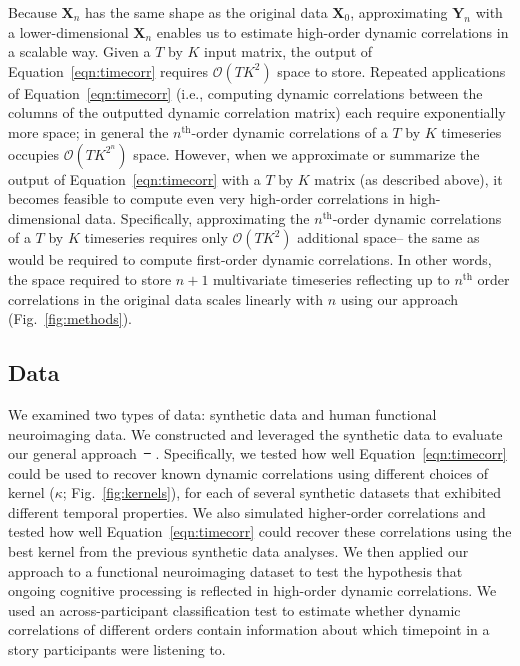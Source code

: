 \documentclass[english]{article}
\providecommand{\DIFaddtex}[1]{{\protect\color{blue}\uwave{#1}}} %
\providecommand{\DIFdeltex}[1]{{\protect\color{red}\sout{#1}}}                      %
\providecommand{\DIFaddbegin}{} %
\providecommand{\DIFaddend}{} %
\providecommand{\DIFdelbegin}{} %
\providecommand{\DIFdelend}{} %
\providecommand{\DIFadd}[1]{\texorpdfstring{\DIFaddtex{#1}}{#1}} %
\providecommand{\DIFdel}[1]{\texorpdfstring{\DIFdeltex{#1}}{}} %
\newcommand{\DIFscaledelfig}{0.5}
\newlength{\DIFdelgraphicswidth} %
\newlength{\DIFdelgraphicsheight} %
\newcommand{\DIFaddincludegraphics}[2][]{{\color{blue}\fbox{\DIFOincludegraphics[#1]{#2}}}} %
\newcommand{\DIFdelincludegraphics}[2][]{%
\sbox{\DIFdelgraphicsbox}{\DIFOincludegraphics[#1]{#2}}%
\settoboxwidth{\DIFdelgraphicswidth}{\DIFdelgraphicsbox} %
\settoboxtotalheight{\DIFdelgraphicsheight}{\DIFdelgraphicsbox} %
\scalebox{\DIFscaledelfig}{%
\parbox[b]{\DIFdelgraphicswidth}{\usebox{\DIFdelgraphicsbox}\\[-\baselineskip] \rule{\DIFdelgraphicswidth}{0em}}\llap{\resizebox{\DIFdelgraphicswidth}{\DIFdelgraphicsheight}{%
\setlength{\unitlength}{\DIFdelgraphicswidth}%
\begin{picture}(1,1)%
\thicklines\linethickness{2pt} %
{\color[rgb]{1,0,0}\put(0,0){\framebox(1,1){}}}%
{\color[rgb]{1,0,0}\put(0,0){\line( 1,1){1}}}%
{\color[rgb]{1,0,0}\put(0,1){\line(1,-1){1}}}%
\end{picture}%
}\hspace*{3pt}}} %
} %
\DeclareRobustCommand{\DIFaddbegin}{\DIFOaddbegin \let\includegraphics\DIFaddincludegraphics} %
\DeclareRobustCommand{\DIFaddend}{\DIFOaddend \let\includegraphics\DIFOincludegraphics} %
\DeclareRobustCommand{\DIFdelbegin}{\DIFOdelbegin \let\includegraphics\DIFdelincludegraphics} %
\DeclareRobustCommand{\DIFdelend}{\DIFOaddend \let\includegraphics\DIFOincludegraphics} %
\begin{document}
Because $\mathbf{X}_n$ has the same shape as the original data
$\mathbf{X}_0$, approximating $\mathbf{Y}_n$ with a lower-dimensional
$\mathbf{X}_n$ enables us to estimate high-order dynamic correlations
in a scalable way.  Given a $T$ by $K$ input matrix, the output of
Equation~\ref{eqn:timecorr} requires $\mathcal{O}(TK^2)$ space to
store.  Repeated applications of Equation~\ref{eqn:timecorr} (i.e.,
computing dynamic correlations between the columns of the outputted
dynamic correlation matrix) each require exponentially more space; in
general the $n^\mathrm{th}$-order dynamic correlations of a $T$ by $K$
timeseries occupies $\mathcal{O}(TK^{2^n})$ space.  However, when we
approximate or summarize the output of Equation~\ref{eqn:timecorr} with a $T$ by
$K$ matrix (as described above), it becomes feasible to compute even
very high-order correlations in high-dimensional data.  Specifically,
approximating the $n^\mathrm{th}$-order dynamic correlations of a $T$
by $K$ timeseries requires only $\mathcal{O}(TK^2)$ additional space--
the same as would be required to compute first-order dynamic
correlations. In other words, the space required to store $n+1$
multivariate timeseries reflecting up to $n^\mathrm{th}$ order
correlations in the original data scales linearly with $n$ using our
approach (Fig.~\ref{fig:methods}).

\subsection*{Data}
We examined two types of data: synthetic data and human functional
neuroimaging data.  We constructed and leveraged the synthetic data to
evaluate our general approach~\DIFdelbegin \DIFdel{\mbox{%
\citep[for a related validation approach
see][]{ThomEtal18}}\hspace{0pt}%
}\DIFdelend \DIFaddbegin \DIFadd{\mbox{%
\cite{ThomEtal18}}\hspace{0pt}%
}\DIFaddend .  Specifically, we tested how well
Equation~\ref{eqn:timecorr} could be used to recover known dynamic
correlations using different choices of kernel ($\kappa$;
Fig.~\ref{fig:kernels}), for each of several synthetic datasets that
exhibited different temporal properties. We also simulated
higher-order correlations and tested how well
Equation~\ref{eqn:timecorr} could recover these correlations using the
best kernel from the previous synthetic data analyses.  We then applied our
approach to a functional neuroimaging dataset to test the hypothesis
that ongoing cognitive processing is reflected in high-order dynamic
correlations.  We used an across-participant classification test to
estimate whether dynamic correlations of different orders contain
information about which timepoint in a story participants were
listening to.
\end{document}
